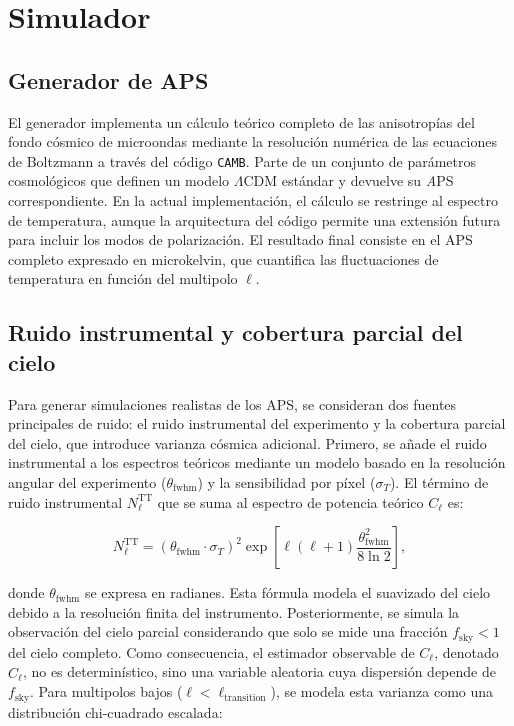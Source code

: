 \documentclass[11pt]{article}
\begin{document}
\section{Simulador}
\subsection{Generador de APS}
El generador implementa un cálculo teórico completo de las anisotropías del fondo cósmico de microondas mediante la resolución numérica de las ecuaciones de Boltzmann a través del código \texttt{CAMB}. Parte de un conjunto de parámetros cosmológicos que definen un modelo $\Lambda$CDM estándar y devuelve su \textit APS correspondiente. En la actual implementación, el cálculo se restringe al espectro de temperatura, aunque la arquitectura del código permite una extensión futura para incluir los modos de polarización. El resultado final consiste en el APS completo expresado en microkelvin, que cuantifica las fluctuaciones de temperatura en función del multipolo $\ell$. 

\subsection{Ruido instrumental y cobertura parcial del cielo}
Para generar simulaciones realistas de los APS, se consideran dos fuentes principales de ruido: el ruido instrumental del experimento y la cobertura parcial del cielo, que introduce varianza cósmica adicional. Primero, se añade el ruido instrumental a los espectros teóricos mediante un modelo basado en la resolución angular del experimento (\(\theta_{\text{fwhm}}\)) y la sensibilidad por píxel (\(\sigma_T\)). El término de ruido instrumental \(N_\ell^{\mathrm{TT}}\) que se suma al espectro de potencia teórico \(C_\ell\) es:

\begin{equation}
N_\ell^{\mathrm{TT}} = \left(\theta_{\text{fwhm}} \cdot \sigma_T \right)^2 \exp\left[ \ell (\ell + 1) \frac{\theta_{\text{fwhm}}^2}{8 \ln 2} \right],
\end{equation}

donde \(\theta_{\text{fwhm}}\) se expresa en radianes. Esta fórmula modela el suavizado del cielo debido a la resolución finita del instrumento. Posteriormente, se simula la observación del cielo parcial considerando que solo se mide una fracción \(f_{\text{sky}} < 1\) del cielo completo. Como consecuencia, el estimador observable de \(C_\ell\), denotado \(\hat{C}_\ell\), no es determinístico, sino una variable aleatoria cuya dispersión depende de \(f_{\text{sky}}\). Para multipolos bajos (\(\ell < \ell_{\text{transition}}\)), se modela esta varianza como una distribución chi-cuadrado escalada:
\end{document}
